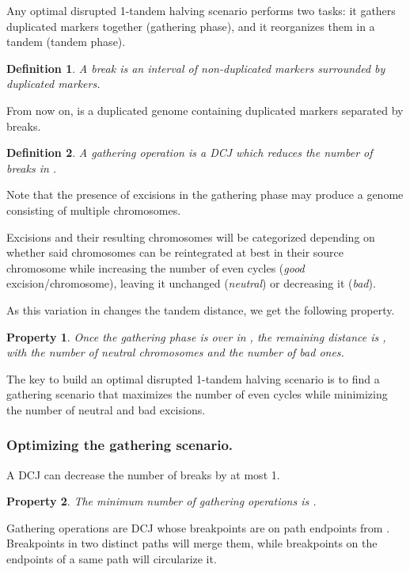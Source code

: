 \documentclass[11pt,final,twoside,nofrench]{thlifl}
\newtheorem{property}{Property}
\newtheorem{definition}{Definition}
\begin{document}
{Any optimal disrupted 1-tandem halving scenario performs two tasks: it gathers duplicated markers together (gathering phase), and it reorganizes them in a tandem (tandem phase).

\begin{definition}
A \emph{break} is an interval of non-duplicated markers surrounded by duplicated markers.
\end{definition}

From now on,  is a duplicated genome containing  duplicated markers separated by  breaks.

\begin{definition}
A \emph{gathering operation} is a DCJ which reduces the number of breaks in .
\end{definition}

Note that the presence of excisions in the gathering phase may produce a genome consisting of multiple chromosomes.

Excisions and their resulting chromosomes will be categorized depending on whether said chromosomes can be reintegrated at best in their source chromosome while increasing the number of even cycles (\emph{good} excision/chromosome), leaving it unchanged (\emph{neutral}) or decreasing it (\emph{bad}).

As this variation in  changes the tandem distance, we get the following property.
\begin{property}
Once the gathering phase is over in , the remaining distance is , with  the number of neutral chromosomes and  the number of bad ones.
\end{property}

The key to build an optimal disrupted 1-tandem halving scenario is to find a gathering scenario that maximizes the number of even cycles while minimizing the number of neutral and bad excisions.

\subsubsection{Optimizing the gathering scenario.}

A DCJ can decrease the number of breaks by at most 1.

\begin{property}
The minimum number of gathering operations is .
\end{property}

Gathering operations are DCJ whose breakpoints are on path endpoints from . Breakpoints in two distinct paths will merge them, while breakpoints on the endpoints of a same path will circularize it.

}
\end{document}

